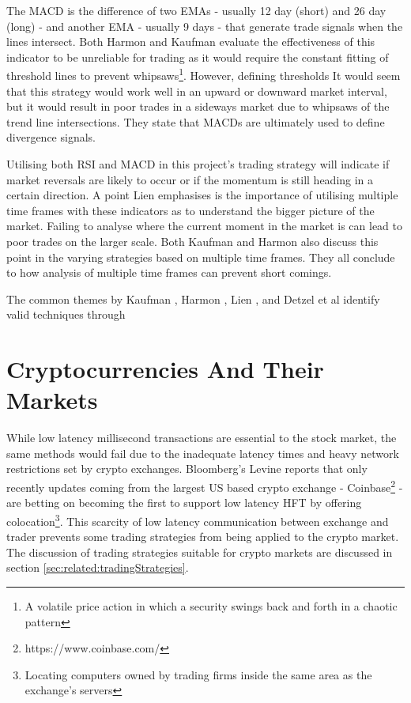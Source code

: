 The MACD is the difference of two EMAs - usually 12 day (short) and 26 day (long) - and another EMA - usually 9 days - that generate trade signals when the lines intersect. Both Harmon \cite{BOOK:Harmon:2014} and Kaufman \cite{BOOK:Kaufman:2013} evaluate the effectiveness of this indicator to be unreliable for trading as it would require the constant fitting of threshold lines to prevent whipsaws\footnote{A volatile price action in which a security swings back and forth in a chaotic pattern}. However, defining thresholds It would seem that this strategy would work well in an upward or downward market interval, but it would result in poor trades in a sideways market due to whipsaws of the trend line intersections. They state that MACDs are ultimately used to define divergence signals.

Utilising both RSI and MACD in this project's trading strategy will indicate if market reversals are likely to occur or if the momentum is still heading in a certain direction. A point Lien \cite{BOOK:Lien:2016} emphasises is the importance of utilising multiple time frames with these indicators as to understand the bigger picture of the market. Failing to analyse where the current moment in the market is can lead to poor trades on the larger scale. Both Kaufman \cite{BOOK:Kaufman:2013} and Harmon also discuss this point in the varying strategies based on multiple time frames. They all conclude to how analysis of multiple time frames can prevent short comings.

The common themes by Kaufman \cite{BOOK:Kaufman:2013}, Harmon \cite{BOOK:Harmon:2014}, Lien \cite{BOOK:Lien:2016}, and Detzel et al \cite{ART:DetzelEtAl:2018} identify valid techniques through


\section{Cryptocurrencies And Their Markets}
\label{sec:related:cryptoAndTheirMarkets}

While low latency millisecond transactions are essential to the stock market, the same methods would fail due to the inadequate latency times and heavy network restrictions set by crypto exchanges. Bloomberg's Levine reports \cite{WEB:Levine:2018} that only recently updates coming from the largest US based crypto exchange - Coinbase\footnote{https://www.coinbase.com/} - are betting on becoming the first to support low latency HFT by offering colocation\footnote{Locating computers owned by trading firms inside the same area as the exchange's servers}. This scarcity of low latency communication between exchange and trader prevents some trading strategies from being applied to the crypto market. The discussion of trading strategies suitable for crypto markets are discussed in section \ref{sec:related:tradingStrategies}.


